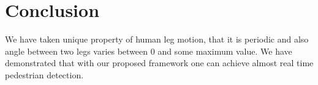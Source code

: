 \documentclass[conference]{IEEEtran}
\begin{document}
%





\section{Conclusion}

We have taken unique property of human leg motion, that it is periodic
and also angle between two legs varies between 0 and some maximum value.
We have demonstrated that with our proposed framework one can achieve
almost real time pedestrian detection.









\end{document}
